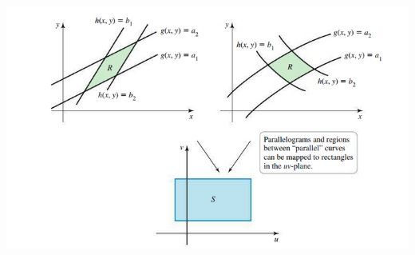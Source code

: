 \documentclass[../mathNotesPreamble]{subfiles}
\begin{document}
      \begin{center}
        \includegraphics[width=\linewidth]{../images/briggs_16_07/fig16_84}
      \end{center}
      \pagebreak
\end{document}

